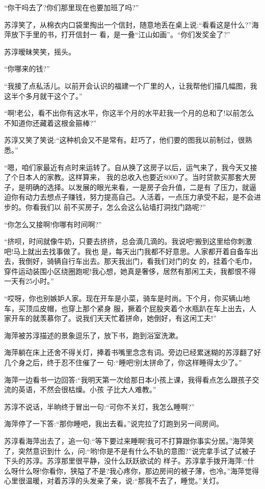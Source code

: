 \documentclass[11pt,a4paper,onecolumn]{article}
\begin{document}
``你干吗去了?你们那里现在也要加班了吗?''

苏淳笑了，从棉衣内口袋里掏出一个信封，随意地丢在桌上说:``看看这是什么?''海萍放下手里的书，打开信封一
看，是一叠``江山如画''。``你们发奖金了?''

苏淳暧昧笑笑，摇头。

``你哪来的钱?''

``我接了点私活儿。以前开会认识的福建一个厂里的人，让我帮他们描几幅图，我这半个多月就干这个了。''

``啊!老公，看不出你有这水平，你这半个月的水平赶我一个月的总和了!以前怎么不知道你还藏着这根金箍棒?''

苏淳又笑了笑说:``这种机会又不是常有。赶巧了，他们要的图我以前制过，很熟悉。''

``嗯，咱们家最近有点时来运转了。自从换了这房子以后，运气来了，我今天又接了个日本人的家教。这样算来，
我的总收入也要近8000了。当时贷款买那套大房子，是明确的选择。以发展的眼光来看，一是房子会升值，二是有
了压力，就逼迫你有动力去想点子赚钱，努力提高自己。人活着，一点压力承受不起，是不会进步的。你看我们以
前不买房子，怎么会这么钻墙打洞找门路呢?''

``你怎么又接啊!你哪有时间啊?''

``挤呗，时间就像牛奶，只要去挤挤，总会滴几滴的。我说吧!搬到这里给你刺激吧!马上就出去找事做了。我也
是，每天出门我都不好意思。人家都开着自备车出去，我倒好，骑辆自行车出去。那天我出门，看我们对门的女
的，挂着个毛巾，穿件运动装围小区绕圈跑呢!我心想，她真是奢侈，居然有那闲工夫，我都恨不得一天有25小时。''

``哎呀，你也别嫉妒人家。现在开车是小菜，骑车是时尚。下个月，你买辆山地车，买顶瓜皮帽，也穿上那个紧身
服，撅着个屁股夹着个水瓶趴在车上出去，人家开车的就羡慕你了。说我们天天忙着拼命，她倒好，有这闲工夫!''

海萍被苏淳描述的景象逗乐了，放下书，跑到浴室洗漱。

海萍躺在床上还舍不得关灯，捧着书嘴里念念有词。旁边已经累迷糊的苏淳翻了好几个身之后，终于忍不住催了一
句:``睡吧!别太拼命了，你这样睡得太少了。''

海萍一边看书一边回答:``我明天第一次给那日本小孩上课，我得看点怎么跟孩子交流的英语，不然会很枯燥。小孩
子比大人难教。''

苏淳不说话，半晌终于冒出一句:``可你不关灯，我怎么睡啊?''

海萍停了一下答:``那你睡吧，我出去看。''说完拉了灯跑到另一间房间。

苏淳看海萍出去了，追一句:``等下要过来睡啊!我可不打算跟你事实分居。''海萍笑了，突然意识到什
么，问:``哟!你是不是有什么不轨的意图?''说完拿手试了试被子下头的苏淳。苏淳那里很平静，没什么跃跃欲试的
样子。苏淳拿手拨开海萍:``什么呀什么呀!你看你，狭隘了不是?我心疼你，那边房间的被子薄，也冷。''海萍觉得
心里很温暖，对着苏淳的头发亲了亲，说:``那我不去了，睡觉。''关灯。
\end{document}
